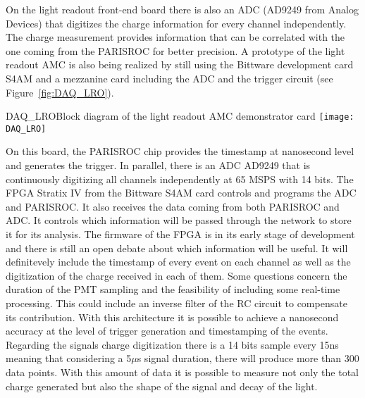 On the light readout front-end board there is also an ADC (AD9249 from Analog Devices) that digitizes the charge information for every channel independently. The charge measurement provides information that can be correlated with the one coming from the PARISROC for better precision. A prototype of the light readout AMC is also being realized by still using the Bittware development card S4AM and a mezzanine card including the ADC and the trigger circuit (see Figure~\ref{fig:DAQ_LRO}). 

\begin{cdrfigure}{DAQ_LRO}{Block diagram of the light readout AMC demonstrator card}
 \texttt{[image: DAQ\_LRO]}  
\end{cdrfigure}

On this board, the PARISROC chip provides the timestamp at nanosecond level and generates the trigger. In parallel, there is an ADC AD9249 that is continuously digitizing all channels independently at 65 MSPS with 14 bits. The FPGA Stratix IV from the Bittware S4AM card controls and programs the ADC and PARISROC. It also receives the data coming from both PARISROC and ADC. It controls which information will be passed through the network to store it for its analysis. The firmware of the FPGA is in its early stage of development and there is still an open debate about which information will be useful. It will definitevely include the timestamp of every event on each channel as well as the digitization of the charge received in each of them. Some questions concern the duration of the PMT sampling and the feasibility of including some real-time processing. This could include an inverse filter of the RC circuit to compensate its contribution. With this architecture it is possible to achieve a nanosecond accuracy at the level of trigger generation and timestamping of the events. Regarding the signals charge digitization there is a 14 bits sample every 15ns meaning that considering a 5$\mu$s signal duration, there will produce more than 300 data points. With this amount of data it is possible to measure not only the total charge generated but also the shape of the signal and decay of the light.

